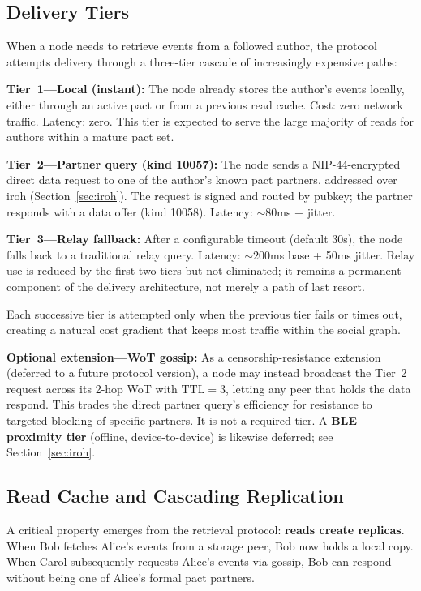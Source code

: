 \documentclass[11pt,a4paper]{article}
\begin{document}
\subsection{Delivery Tiers}

When a node needs to retrieve events from a followed author, the protocol attempts delivery through a three-tier cascade of increasingly expensive paths:

\textbf{Tier~1---Local (instant):} The node already stores the author's events locally, either through an active pact or from a previous read cache. Cost: zero network traffic. Latency: zero. This tier is expected to serve the large majority of reads for authors within a mature pact set.

\textbf{Tier~2---Partner query (kind 10057):} The node sends a NIP-44-encrypted direct data request to one of the author's known pact partners, addressed over iroh (Section~\ref{sec:iroh}). The request is signed and routed by pubkey; the partner responds with a data offer (kind 10058). Latency: ${\sim}80$ms + jitter.

\textbf{Tier~3---Relay fallback:} After a configurable timeout (default 30s), the node falls back to a traditional relay query. Latency: ${\sim}200$ms base + 50ms jitter. Relay use is reduced by the first two tiers but not eliminated; it remains a permanent component of the delivery architecture, not merely a path of last resort.

Each successive tier is attempted only when the previous tier fails or times out, creating a natural cost gradient that keeps most traffic within the social graph.

\textbf{Optional extension---WoT gossip:} As a censorship-resistance extension (deferred to a future protocol version), a node may instead broadcast the Tier~2 request across its 2-hop WoT with TTL$=$3, letting any peer that holds the data respond. This trades the direct partner query's efficiency for resistance to targeted blocking of specific partners. It is not a required tier. A \textbf{BLE proximity tier} (offline, device-to-device) is likewise deferred; see Section~\ref{sec:iroh}.

\subsection{Read Cache and Cascading Replication}

A critical property emerges from the retrieval protocol: \textbf{reads create replicas}. When Bob fetches Alice's events from a storage peer, Bob now holds a local copy. When Carol subsequently requests Alice's events via gossip, Bob can respond---without being one of Alice's formal pact partners.
\end{document}

